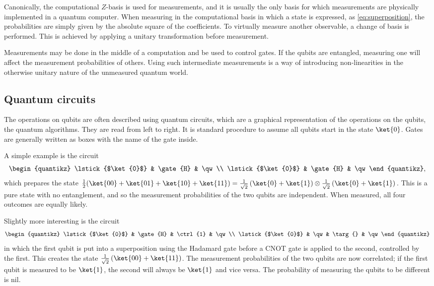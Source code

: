 Canonically, the computational $Z$-basis is used for measurements, and it is usually the only basis for which measurements are physically implemented in a quantum computer.
When measuring in the computational basis in which a state is expressed, as \cref{eq:superposition}, the probabilities are simply given by the absolute square of the coefficients.
To virtually measure another observable, a change of basis is performed.
This is achieved by applying a unitary transformation before measurement.

Measurements may be done in the middle of a computation and be used to control gates.
If the qubits are entangled, measuring one will affect the measurement probabilities of others.
Using such intermediate measurements is a way of introducing non-linearities in the otherwise unitary nature of the unmeasured quantum world.

\subsection{Quantum circuits}
The operations on qubits are often described using quantum circuits, which are a graphical representation of the operations on the qubits, the quantum algorithms.
They are read from left to right.
It is standard procedure to assume all qubits start in the state $\ket{0}$.
Gates are generally written as boxes with the name of the gate inside.

A simple example is the circuit
\begin{equation}
    \begin{quantikz}
        \lstick{$\ket{0}$} & \gate{H} & \qw \\
        \lstick{$\ket{0}$} & \gate{H} & \qw
    \end{quantikz},
\end{equation}
which prepares the state
$
    \frac{1}{2}(\ket{00} + \ket{01} + \ket{10} + \ket{11})
    =
    \frac{1}{\sqrt{2}}
    \left(
    \ket{0} + \ket{1}
    \right)
    \otimes
    \frac{1}{\sqrt{2}}
    \left(
    \ket{0} + \ket{1}
    \right)
$.
This is a pure state with no entanglement, and so the measurement probabilities of the two qubits are independent.
When measured, all four outcomes are equally likely.

Slightly more interesting is the circuit
\begin{equation}
    \begin{quantikz}
        \lstick{$\ket{0}$} & \gate{H} & \ctrl{1} & \qw \\
        \lstick{$\ket{0}$} & \qw & \targ{} & \qw
    \end{quantikz}
\end{equation}
in which the first qubit is put into a superposition using the Hadamard gate before a CNOT gate is applied to the second, controlled by the first.
This creates the state $\frac{1}{\sqrt{2}}\left(\ket{00} + \ket{11}\right)$.
The measurement probabilities of the two qubits are now correlated; if the first qubit is measured to be $\ket{1}$, the second will always be $\ket{1}$ and vice versa.
The probability of measuring the qubits to be different is nil.

